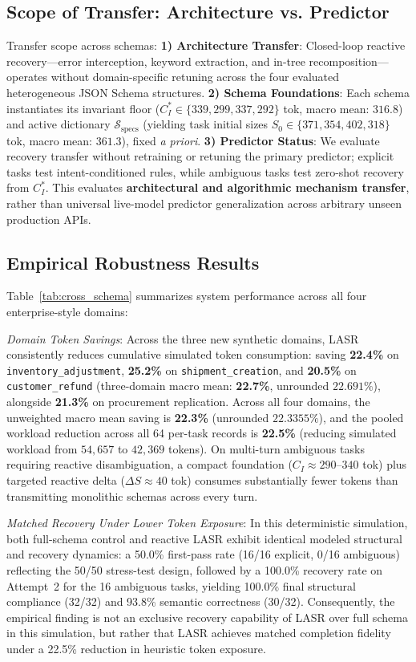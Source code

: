 \subsection{Scope of Transfer: Architecture vs. Predictor}
Transfer scope across schemas: \textbf{1) Architecture Transfer}: Closed-loop reactive recovery---error interception, keyword extraction, and in-tree recomposition---operates without domain-specific retuning across the four evaluated heterogeneous JSON Schema structures. \textbf{2) Schema Foundations}: Each schema instantiates its invariant floor ($C_I^* \in \{339, 299, 337, 292\}$ tok, macro mean: $316.8$) and active dictionary $\mathcal{S}_{\text{specs}}$ (yielding task initial sizes $S_0 \in \{371, 354, 402, 318\}$ tok, macro mean: $361.3$), fixed \textit{a priori}. \textbf{3) Predictor Status}: We evaluate recovery transfer without retraining or retuning the primary predictor; explicit tasks test intent-conditioned rules, while ambiguous tasks test zero-shot recovery from $C_I^*$. This evaluates \textbf{architectural and algorithmic mechanism transfer}, rather than universal live-model predictor generalization across arbitrary unseen production APIs.

\subsection{Empirical Robustness Results}
Table~\ref{tab:cross_schema} summarizes system performance across all four enterprise-style domains:

\textit{Domain Token Savings}: Across the three new synthetic domains, LASR consistently reduces cumulative simulated token consumption: saving \textbf{22.4\%} on \texttt{inventory\_adjustment}, \textbf{25.2\%} on \texttt{shipment\_creation}, and \textbf{20.5\%} on \texttt{customer\_refund} (three-domain macro mean: \textbf{22.7\%}, unrounded $22.691\%$), alongside \textbf{21.3\%} on procurement replication. Across all four domains, the unweighted macro mean saving is \textbf{22.3\%} (unrounded $22.3355\%$), and the pooled workload reduction across all 64 per-task records is \textbf{22.5\%} (reducing simulated workload from $54,657$ to $42,369$ tokens). On multi-turn ambiguous tasks requiring reactive disambiguation, a compact foundation ($C_I \approx 290$--$340$ tok) plus targeted reactive delta ($\Delta S \approx 40$ tok) consumes substantially fewer tokens than transmitting monolithic schemas across every turn.

\textit{Matched Recovery Under Lower Token Exposure}: In this deterministic simulation, both full-schema control and reactive LASR exhibit identical modeled structural and recovery dynamics: a 50.0\% first-pass rate (16/16 explicit, 0/16 ambiguous) reflecting the 50/50 stress-test design, followed by a 100.0\% recovery rate on Attempt~2 for the 16 ambiguous tasks, yielding 100.0\% final structural compliance (32/32) and 93.8\% semantic correctness (30/32). Consequently, the empirical finding is not an exclusive recovery capability of LASR over full schema in this simulation, but rather that LASR achieves matched completion fidelity under a 22.5\% reduction in heuristic token exposure.

